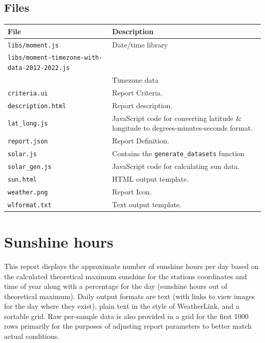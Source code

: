 \documentclass[a4paper,10pt]{book}
\begin{document}
\subsection{Files}
\begin{tabular}{p{3.8cm} p{10cm}}
\hline
\textbf{File} & \textbf{Description} \\
\hline
\verb|libs/moment.js| & Date/time library\\
\verb|libs/moment-timezone-with-data-2012-2022.js| & \\
& Timezone data \\
\verb|criteria.ui| & Report Criteria.\\
\verb|description.html| & Report description. \\
\verb|lat_long.js| & JavaScript code for converting latitude \& longitude to degrees-minutes-seconds format.\\
\verb|report.json| & Report Definition.\\
\verb|solar.js| & Contains the \verb|generate_datasets| function\\
\verb|solar_gen.js| & JavaScript code for calculating sun data.\\
\verb|sun.html| & HTML output template.\\
\verb|weather.png| & Report Icon.\\
\verb|wlformat.txt| & Text output template.\\
\hline
\end{tabular}

\section{Sunshine hours}
This report displays the approximate number of sunshine hours per day based on the calculated theoretical maximum sunshine for the stations coordinates and time of year along with a percentage for the day (sunshine hours out of theoretical maximum). Daily output formats are text (with links to view images for the day where they exist), plain text in the style of WeatherLink, and a sortable grid. Raw per-sample data is also provided in a grid for the first 1000 rows primarily for the purposes of adjusting report parameters to better match actual conditions.
\end{document}
